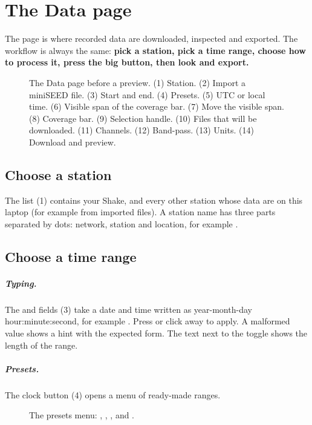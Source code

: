 \chapter{The Data page}\label{ch:data}

The  page is where recorded data are downloaded, inspected and exported. The workflow is always the same: \textbf{pick a
station, pick a time range, choose how to process it, press the big button, then look and export.}

\begin{figure}[tbp]
\centering
{}
\caption{The Data page before a preview. (1) Station. (2) Import a miniSEED file. (3) Start and end. (4) Presets.
(5) UTC or local time. (6) Visible span of the coverage bar. (7) Move the visible span. (8) Coverage bar. (9) Selection handle.
(10) Files that will be downloaded. (11) Channels. (12) Band-pass. (13) Units. (14) Download and preview.}\label{fig:datatop}
\end{figure}

\section{Choose a station}
The  list (1) contains your Shake, and every other station whose data are on this laptop (for example from imported
files). A station name has three parts separated by dots: network, station and location, for example .

\section{Choose a time range}
\paragraph{Typing.} The  and  fields (3) take a date and time written as year-month-day hour:minute:second, for example . Press
 or click away to apply. A malformed value shows a hint with the expected form. The text next to the toggle shows
the length of the range.

\paragraph{Presets.} The clock button (4) opens a menu of ready-made ranges.

\begin{figure}[tbp]
\centering
{}
\caption{The presets menu: , , ,  and .}
\end{figure}

